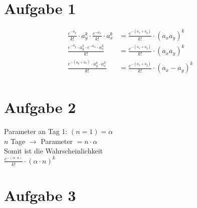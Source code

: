 \documentclass[11pt,a4paper]{article}
\author{Lukas Vormwald \and Noah Mehling \and Gregor Seewald}
\date{Übung 5:Dienstag 12:00}
\newcommand{\Aufgabe}[1]{\section*{Aufgabe #1}}
\begin{document}
  \maketitle

    \Aufgabe{1}

      \begin{align*}
        \frac{e^{-a_y}}{k!}\cdot a_y^k \cdot \frac{e^{-a_x}}{k!} \cdot a_x^k &= \frac{e^{-(a_x+a_y)}}{k!} \cdot (a_x a_y)^k\\
        \frac{e^{-a_y}\cdot a_y^k \cdot e^{-a_x}\cdot a_x^k}{k!} &= \frac{e^{-(a_x+a_y)}}{k!} \cdot (a_x a_y)^k\\
        \frac{e^{-(a_y+a_x)}\cdot a_y^k \cdot a_x^k}{k!} &= \frac{e^{-(a_x+a_y)}}{k!} \cdot (a_x-a_y)^k\\
      \end{align*}

    \Aufgabe 2

      Parameter an Tag 1: $\left(n=1\right)=\alpha$\\
      $n$ Tage $\rightarrow$ Parameter $=n\cdot\alpha$\\
      Somit ist die Wahrscheinlichkeit\\
      $\frac{e^{-\left(\alpha\cdot n\right)}}{k!}\cdot \left(\alpha\cdot n\right)^k$

    \Aufgabe 3
\end{document}
